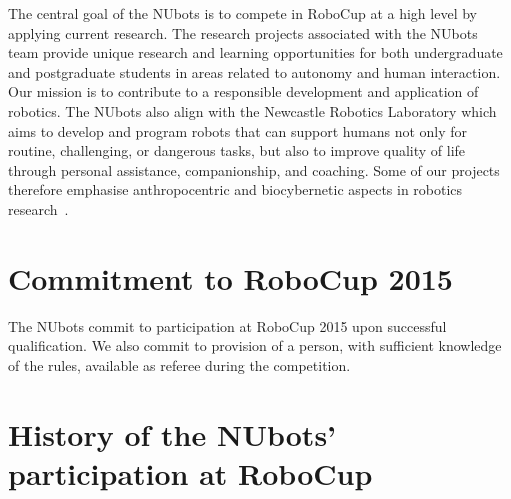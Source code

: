 \documentclass{llncs}
\begin{document}
The central goal of the NUbots is to compete in RoboCup at a high level by applying current research. The research projects associated with the NUbots team provide unique research and learning opportunities for both undergraduate and postgraduate students in areas related to autonomy and human interaction. Our mission is to contribute to a responsible development and application of robotics. The NUbots also align with the Newcastle Robotics Laboratory which aims to develop and program robots that can support humans not only for routine, challenging, or dangerous tasks, but also to improve quality of life through personal assistance, companionship, and coaching. Some of our projects therefore emphasise anthropocentric and biocybernetic aspects in robotics research~\cite{ChalupOstwald2009,walker2015adaptivemusic,HongEtAl2014,WongEtAl2013}.


\section{Commitment to RoboCup 2015}
The NUbots commit to participation at RoboCup 2015 upon successful qualification. We also commit to provision of a person, with sufficient knowledge of the rules, available as referee during the competition.

\section{History of the NUbots' participation at RoboCup}
\end{document}
